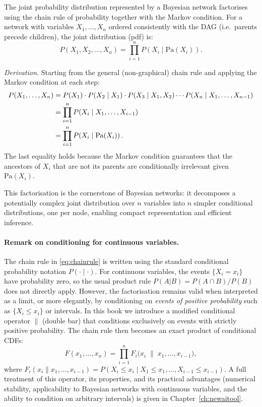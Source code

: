 The joint probability distribution represented by a Bayesian network
factorises using the chain rule of probability together with the Markov
condition. For a network with variables $X_1, \ldots, X_n$ ordered
consistently with the DAG (i.e.\ parents precede children), the joint
distribution (pdf) is:
\begin{equation}\label{eq:chainrule}
  P(X_1, X_2, \ldots, X_n)
  = \prod_{i=1}^{n} P\!\left(X_i \mid \mathrm{Pa}(X_i)\right).
\end{equation}

\noindent\textit{Derivation.} Starting from the general (non-graphical) chain
rule and applying the Markov condition at each step:
\begin{align}
P(X_1, \ldots, X_n)
  &= P(X_1)\cdot P(X_2\mid X_1)\cdot P(X_3\mid X_1,X_2)
     \cdots P(X_n\mid X_1,\ldots,X_{n-1}) \notag\\
  &= \prod_{i=1}^{n} P(X_i \mid X_1, \ldots, X_{i-1}) \notag\\
  &= \prod_{i=1}^{n} P\!\left(X_i \mid \mathrm{Pa}(X_i)\right). \notag
\end{align}
The last equality holds because the Markov condition guarantees that the
ancestors of $X_i$ that are not its parents are conditionally irrelevant
given $\mathrm{Pa}(X_i)$.

This factorisation is the cornerstone of Bayesian networks: it decomposes a
potentially complex joint distribution over $n$ variables into $n$ simpler
conditional distributions, one per node, enabling compact representation and
efficient inference.

\medskip

\paragraph{Remark on conditioning for continuous variables.}
The chain rule in \eqref{eq:chainrule} is written using the standard conditional probability notation $P(\cdot \mid \cdot)$.
For continuous variables, the events $\{X_i = x_i\}$ have probability zero, so the usual product rule $P(A|B)=P(A\cap B)/P(B)$ does not directly apply.
However, the factorisation remains valid when interpreted as a limit, or more elegantly, by conditioning on \emph{events of positive probability} such as $\{X_i \le x_i\}$ or intervals.
In this book we introduce a modified conditional operator $\parallel$ (double bar) that conditions exclusively on events with strictly positive probability.
The chain rule then becomes an exact product of conditional CDFs:
\[
F(x_1,\dots,x_n) = \prod_{i=1}^{n} F_i\bigl(x_i \;\big\|\; x_1,\dots,x_{i-1}\bigr),
\]
where $F_i(x_i \parallel x_1,\dots,x_{i-1}) = P(X_i \le x_i \mid X_1 \le x_1,\dots,X_{i-1} \le x_{i-1})$.
A full treatment of this operator, its properties, and its practical advantages (numerical stability, applicability to Bayesian networks with continuous variables, and the ability to condition on arbitrary intervals) is given in Chapter~\ref{ch:newaitool}.

